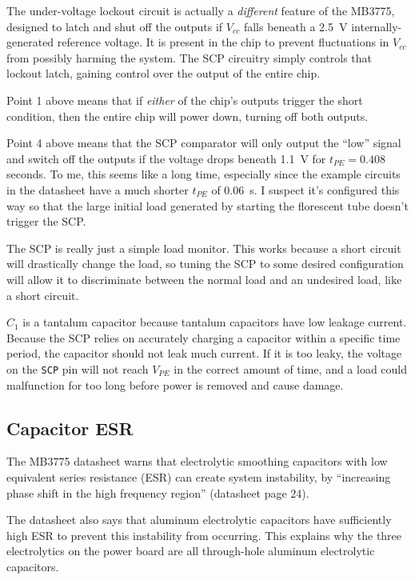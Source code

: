 \documentclass{article}
\newcommand{\Vcc}{$V_{cc}$}
\newcommand{\chippin}{\texttt}
\newcommand{\model}{\textsf}
\begin{document}
The under-voltage lockout circuit is actually a \emph{different}
feature of the \model{MB3775}, designed to latch and shut off the
outputs if \Vcc{} falls beneath a \qty{2.5}{\volt}
internally-generated reference voltage. It is present in the chip to
prevent fluctuations in \Vcc{} from possibly harming the system. The
SCP circuitry simply controls that lockout latch, gaining control over
the output of the entire chip.

Point 1 above means that if \emph{either} of the chip's outputs
trigger the short condition, then the entire chip will power down,
turning off both outputs.

Point 4 above means that the SCP comparator will only output the
``low'' signal and switch off the outputs if the voltage drops beneath
\qty{1.1}{\volt} for $t_{PE} = 0.408$ seconds. To me, this seems like
a long time, especially since the example circuits in the datasheet
have a much shorter $t_{PE}$ of \qty{0.06}{\second}. I suspect it's
configured this way so that the large initial load generated by
starting the florescent tube doesn't trigger the SCP.

The SCP is really just a simple load monitor. This works because a
short circuit will drastically change the load, so tuning the SCP to
some desired configuration will allow it to discriminate between the
normal load and an undesired load, like a short circuit.

$C_1$ is a tantalum capacitor because tantalum capacitors have low
leakage current. Because the SCP relies on accurately charging a
capacitor within a specific time period, the capacitor should not leak
much current. If it is too leaky, the voltage on the \chippin{SCP} pin
will not reach $V_{PE}$ in the correct amount of time, and a load could
malfunction for too long before power is removed and cause damage.

\subsection{Capacitor ESR}
The \model{MB3775} datasheet warns that electrolytic smoothing
capacitors with low equivalent series resistance (ESR) can create
system instability, by ``increasing phase shift in the high frequency
region'' (datasheet page 24).

The datasheet also says that aluminum electrolytic capacitors have
sufficiently high ESR to prevent this instability from occurring. This
explains why the three electrolytics on the power board are all
through-hole aluminum electrolytic capacitors.
\end{document}
